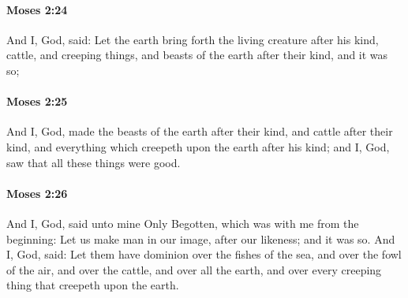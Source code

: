 		\paragraph{Moses 2:24} %
			\label{MOSES-2-24}

			And I, God, said: Let the earth bring forth the living creature after his kind, cattle, and creeping things, and beasts of the earth after their kind, and it was so;


		\paragraph{Moses 2:25} %
			\label{MOSES-2-25}

			And I, God, made the beasts of the earth after their kind, and cattle after their kind, and everything which creepeth upon the earth after his kind; and I, God, saw that all these things were good.


		\paragraph{Moses 2:26} %
			\label{MOSES-2-26}

			And I, God, said unto mine Only Begotten, which was with me from the beginning: Let us make man in our image, after our likeness; and it was so. And I, God, said: Let them have dominion over the fishes of the sea, and over the fowl of the air, and over the cattle, and over all the earth, and over every creeping thing that creepeth upon the earth.

